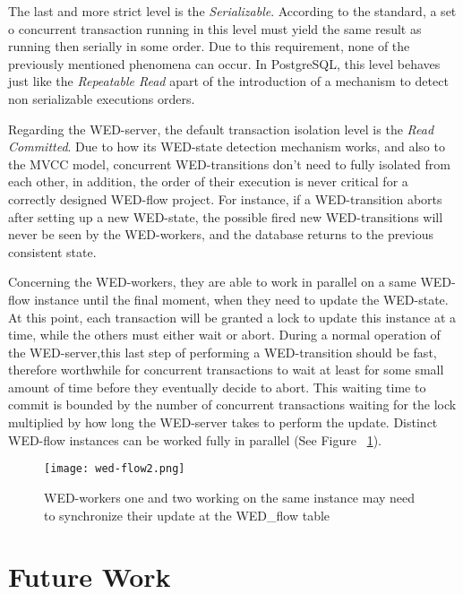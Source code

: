 \documentclass[12pt]{article}
\begin{document}
\par The last and more strict level is the \emph{Serializable}. According to the standard, a set o concurrent transaction
running in this level must yield the same result as running then serially in some order. Due to this requirement, none of 
the previously mentioned phenomena can occur. In PostgreSQL, this level behaves just like the \emph{Repeatable Read} apart
of the introduction of a mechanism to detect non serializable executions orders. 
 
\par Regarding the WED-server, the default transaction isolation level is the \emph{Read Committed}. Due to how its
WED-state detection mechanism works, and also to the MVCC model, concurrent WED-transitions don't need to fully isolated 
from each other, in addition, the order of their execution is never critical for a correctly designed WED-flow project. 
For instance, if a WED-transition aborts after setting up a new WED-state, the possible fired new WED-transitions
will never be seen by the WED-workers, and the database returns to the previous consistent state.  

\par Concerning the WED-workers, they are able to work in parallel on a same WED-flow instance until the final moment, when
they need to update the WED-state. At this point, each transaction will be granted a lock to update this instance at a time,
while the others must either wait or abort. During a normal operation of the WED-server,this last step of performing a WED-transition
should be fast, therefore worthwhile for concurrent transactions to wait at least for some small amount of time before they
eventually decide to abort. This waiting time to commit is bounded by the number of concurrent transactions waiting for 
the lock multiplied by how long the WED-server takes to perform the update. Distinct WED-flow instances can be worked fully
in parallel (See Figure ~\ref{fig_wf}).
   
\begin{figure}[!t]
\centering
\texttt{[image: wed-flow2.png]}
\caption{WED-workers one and two working on the same instance may need to synchronize their update at the WED\_flow table}
\label{fig_wf}
\end{figure}


\section{Future Work}
\label{sec:fut}
\end{document}
